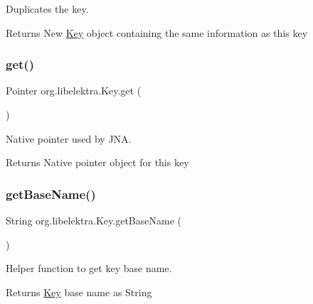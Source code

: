 Duplicates the key. 

\begin{DoxyReturn}{Returns}
New \hyperlink{classorg_1_1libelektra_1_1Key}{Key} object containing the same information as this key 
\end{DoxyReturn}
\mbox{\label{classorg_1_1libelektra_1_1Key_a3c65267ac3d24c3eae35db576414fe4f}} 
\subsubsection{\texorpdfstring{get()}{get()}}
{\footnotesize\ttfamily Pointer org.\+libelektra.\+Key.\+get (\begin{DoxyParamCaption}{ }\end{DoxyParamCaption})\hspace{0.3cm}{\ttfamily [inline]}}



Native pointer used by J\+NA. 

\begin{DoxyReturn}{Returns}
Native pointer object for this key 
\end{DoxyReturn}
\mbox{\label{classorg_1_1libelektra_1_1Key_a32c556682f808bbc0a4b676879f6b86f}} 
\subsubsection{\texorpdfstring{get\+Base\+Name()}{getBaseName()}}
{\footnotesize\ttfamily String org.\+libelektra.\+Key.\+get\+Base\+Name (\begin{DoxyParamCaption}{ }\end{DoxyParamCaption})\hspace{0.3cm}{\ttfamily [inline]}}



Helper function to get key base name. 

\begin{DoxyReturn}{Returns}
\hyperlink{classorg_1_1libelektra_1_1Key}{Key} base name as String 
\end{DoxyReturn}
\mbox{\label{classorg_1_1libelektra_1_1Key_a24bd83bcae08b956150d8ae3dafe738e}} 
